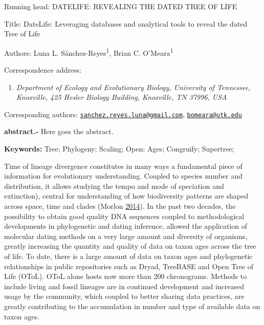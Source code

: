 \documentclass[]{article}
\title{}
\author{}
\date{}
\providecommand{\tightlist}{%
  \setlength{\itemsep}{0pt}\setlength{\parskip}{0pt}}
\begin{document}
Running head: DATELIFE: REVEALING THE DATED TREE OF LIFE

Title: DateLife: Leveraging databases and analytical tools to reveal the dated Tree of Life

Authors: Luna L. Sánchez-Reyes\textsuperscript{1}, Brian C. O'Meara\textsuperscript{1}

Correspondence address:

\begin{enumerate}
\def\labelenumi{\arabic{enumi}.}
\tightlist
\item
  \emph{Department of Ecology and Evolutionary Biology, University of Tennessee, Knoxville, 425 Hesler Biology Building, Knoxville, TN 37996, USA}
\end{enumerate}

Corresponding authors: \href{mailto:sanchez.reyes.luna@gmail.com}{\nolinkurl{sanchez.reyes.luna@gmail.com}}, \href{mailto:bomeara@utk.edu}{\nolinkurl{bomeara@utk.edu}}

\newpage

\textbf{abstract.-} Here goes the abstract.

\textbf{Keywords:} Tree; Phylogeny; Scaling; Open; Ages; Congruify; Supertree;

\newpage

Time of lineage divergence
constitutes in many ways a fundamental piece of information for evolutionary
understanding.
Coupled to species number and distribution, it allows studying the tempo and mode of speciation
and extinction),
central for understanding of how biodiversity
patterns are shaped across space, time and clades (Morlon \protect\hyperlink{ref-Morlon2014}{2014}).
In the past two decades, the possibility to obtain good quality DNA sequences
coupled to methodological developments in phylogenetic and dating inference, allowed
the application of molecular dating methods on a very large amount and diversity
of organisms, greatly increasing the quantity and quality of data on taxon
ages across the tree of life.
To date, there is a large amount of
data on taxon ages and phylogenetic relationships in public repositories such as Dryad, TreeBASE
and Open Tree of Life (OToL).
OToL alone hosts now more than 200 chronograms.
Methods to include living and fossil lineages are in continued development and increased
usage by the community,
which coupled to better sharing data practices, are greatly contributing to the
accumulation in number and type of available data on taxon ages.
\end{document}
